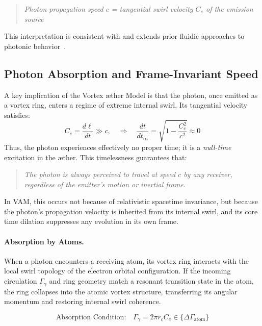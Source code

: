         \begin{quote}
            \emph{Photon propagation speed $c$ =  tangential swirl velocity  $C_e$  of the emission source}
        \end{quote}

        This interpretation is consistent with and extends prior fluidic approaches to photonic behavior~\cite{iskandarani2025b, barut1990, berry2000}.

\subsection{Photon Absorption and Frame-Invariant Speed}

        A key implication of the Vortex \ae ther Model is that the photon, once emitted as a vortex ring, enters a regime of extreme internal swirl. Its tangential velocity satisfies:
        \begin{equation}
            C_e = \frac{d\ell}{dt} \gg c, \quad \Rightarrow \quad \frac{dt}{dt_\infty} = \sqrt{1 - \frac{C_e^2}{c^2}} \approx 0
        \end{equation}
        Thus, the photon experiences effectively no proper time; it is a \emph{null-time} excitation in the \ae ther. This timelessness guarantees that:

        \begin{quote}
            \emph{The photon is always perceived to travel at speed $c$ by any receiver, regardless of the emitter’s motion or inertial frame.}
        \end{quote}

        In VAM, this occurs not because of relativistic spacetime invariance, but because the photon's propagation velocity is inherited from its internal swirl, and its core time dilation suppresses any evolution in its own frame.

        \paragraph{Absorption by Atoms.} When a photon encounters a receiving atom, its vortex ring interacts with the local swirl topology of the electron orbital configuration. If the incoming circulation $\Gamma_\gamma$ and ring geometry match a resonant transition state in the atom, the ring collapses into the atomic vortex structure, transferring its angular momentum and restoring internal swirl coherence.

        \begin{equation}
            \text{Absorption Condition:} \quad \Gamma_\gamma = 2\pi r_c C_e \in \{ \Delta \Gamma_{\text{atom}} \}
        \end{equation}

